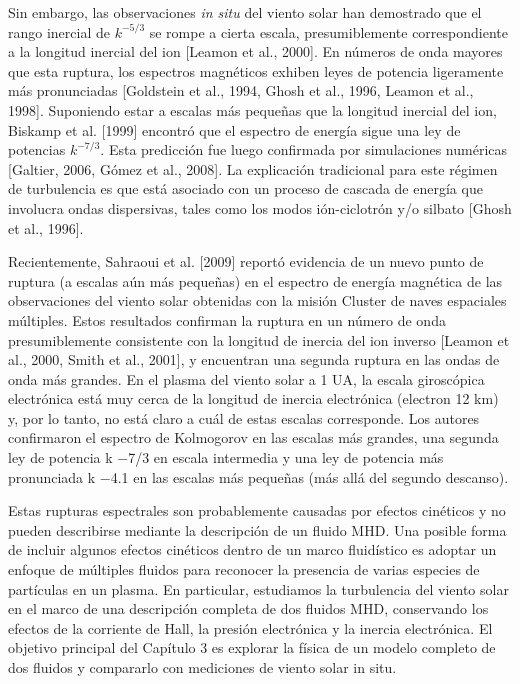 Sin embargo, las observaciones \emph{in situ} del viento solar han
demostrado que el rango inercial de $k^{-5/3}$ se rompe a cierta
escala, presumiblemente correspondiente a la longitud inercial del ion
[Leamon et al., 2000]. En números de onda mayores que esta ruptura,
los espectros magnéticos exhiben leyes de potencia ligeramente más
pronunciadas [Goldstein et al., 1994, Ghosh et al., 1996, Leamon et
  al., 1998]. Suponiendo estar a escalas más pequeñas que la longitud
inercial del ion, Biskamp et al. [1999] encontró que el espectro de
energía sigue una ley de potencias $k^{-7/3}$. Esta predicción fue
luego confirmada por simulaciones numéricas [Galtier, 2006, Gómez et
  al., 2008]. La explicación tradicional para este régimen de
turbulencia es que está asociado con un proceso de cascada de energía
que involucra ondas dispersivas, tales como los modos ión-ciclotrón
y/o silbato [Ghosh et al., 1996].

Recientemente, Sahraoui et al. [2009] reportó evidencia de un nuevo
punto de ruptura (a escalas aún más pequeñas) en el espectro de
energía magnética de las observaciones del viento solar obtenidas con
la misión Cluster de naves espaciales múltiples. Estos resultados
confirman la ruptura en un número de onda presumiblemente consistente
con la longitud de inercia del ion inverso [Leamon et al., 2000, Smith
  et al., 2001], y encuentran una segunda ruptura en las ondas de onda
más grandes. En el plasma del viento solar a 1 UA, la escala
giroscópica electrónica está muy cerca de la longitud de inercia
electrónica (electron 12 km) y, por lo tanto, no está claro a cuál de
estas escalas corresponde. Los autores confirmaron el espectro de
Kolmogorov en las escalas más grandes, una segunda ley de potencia k
−7/3 en escala intermedia y una ley de potencia más pronunciada k −4.1
en las escalas más pequeñas (más allá del segundo descanso).

Estas rupturas espectrales son probablemente causadas por efectos cinéticos y no pueden describirse mediante la descripción de un fluido MHD. Una posible forma de incluir algunos efectos cinéticos dentro de un marco fluidístico es adoptar un enfoque de múltiples fluidos para reconocer la presencia de varias especies de partículas en un plasma. En particular, estudiamos la turbulencia del viento solar en el marco de una descripción completa de dos fluidos MHD, conservando los efectos de la corriente de Hall, la presión electrónica y la inercia electrónica. El objetivo principal del Capítulo 3 es explorar la física de un modelo completo de dos fluidos y compararlo con mediciones de viento solar in situ.
